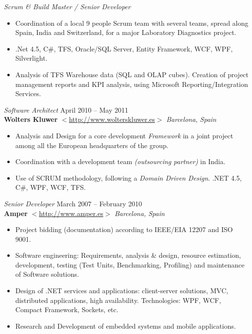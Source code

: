 \documentclass[line,margin]{res}
\begin{document}
\begin{resume}
                {\sl Scrum {\&} Build Master / Senior Developer}
                \begin{itemize}  \itemsep 2pt 
                \item Coordination of a local 9 people Scrum team with several teams, 
                spread along Spain, India and Switzerland, for a major Laboratory Diagnostics project.
                \item .Net 4.5, C{\#}, TFS, Oracle/SQL Server, Entity Framework, WCF, WPF, Silverlight.
                \item Analysis of TFS Warehouse data (SQL and OLAP cubes). Creation of project management reports and KPI analysis, using Microsoft Reporting/Integration Services. 
                \\
                \end{itemize}
                

                {\sl Software Architect} \hfill April 2010 -- May 2011 \\
                \textbf{Wolters Kluwer} 
                $<$\url{http://www.wolterskluwer.es}$>$ \hfill \textit{Barcelona, Spain}
                \begin{itemize}  \itemsep 2pt 
                \item Analysis and Design for a core development \textit{Framework} 
                in a joint project among all the European headquarters of the group.
                \item Coordination with a development team \textit{(outsourcing partner)} 
                in India.
                \item Use of SCRUM methodology, following a \textit{Domain Driven Design}. .NET 4.5, C{\#}, WPF, WCF, TFS.
                \\
                \end{itemize}


                {\sl Senior Developer} \hfill            March 2007 -- February 2010 \\
                \textbf{Amper} 
                $<$\url{http://www.amper.es}$>$ \hfill \textit{Barcelona, Spain}
                \begin{itemize}  \itemsep 2pt         
                \item Project bidding (documentation) according to IEEE/EIA 12207
                and ISO 9001.               
                \item Software engineering: Requirements, analysis \& design, 
                resource estimation, development, testing (Test Units, Benchmarking,
                Profiling) and maintenance of Software solutions.               
                \item Design of .NET services and applications: client-server
                solutions, MVC, distributed applications, high availability.
                Technologies: WPF, WCF, Compact Framework,
                Sockets, etc.
                \item Research and Development of embedded systems and mobile
                applications.
                \\
                \end{itemize}



\end{resume}
\end{document}

